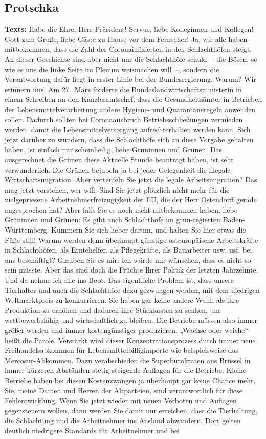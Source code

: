 \documentclass{article}
\begin{document}
\subsection{Protschka}
\noindent\textbf{Texts:} Habe die Ehre, Herr Präsident! Servus, liebe Kolleginnen und Kollegen! Gott zum Gruße, liebe Gäste zu Hause vor dem Fernseher! Ja, wir alle haben mitbekommen, dass die Zahl der Coronainfizierten in den Schlachthöfen steigt. An dieser Geschichte sind aber nicht nur die Schlachthöfe schuld – die Bösen, so wie es uns die linke Seite im Plenum weismachen will –, sondern die Verantwortung dafür liegt in erster Linie bei der Bundesregierung. Warum? Wir erinnern uns: Am 27. März forderte die Bundeslandwirtschaftsministerin in einem Schreiben an den Kanzleramtschef, dass die Gesundheitsämter in Betrieben der Lebensmittelverarbeitung andere Hygiene- und Quarantäneregeln anwenden sollen. Dadurch sollten bei Coronaausbruch Betriebsschließungen vermieden werden, damit die Lebensmittelversorgung aufrechterhalten werden kann. Sich jetzt darüber zu wundern, dass die Schlachthöfe sich an diese Vorgabe gehalten haben, ist einfach nur scheinheilig, liebe Grüninnen und Grünen.  Das ausgerechnet die Grünen diese Aktuelle Stunde beantragt haben, ist sehr verwunderlich. Die Grünen bejubeln ja bei jeder Gelegenheit die illegale Wirtschaftsmigration.  Aber verteufeln Sie jetzt die legale Arbeitsmigration? Das mag jetzt verstehen, wer will. Sind Sie jetzt plötzlich nicht mehr für die vielgepriesene Arbeitnehmerfreizügigkeit der EU, die der Herr Ostendorff gerade angesprochen hat? Aber falls Sie es noch nicht mitbekommen haben, liebe Grüninnen und Grünen: Es gibt auch Schlachthöfe im grün-regierten Baden-Württemberg. Kümmern Sie sich lieber darum, und halten Sie hier etwas die Füße still! Warum werden denn überhaupt günstige osteuropäische Arbeitskräfte in Schlachthöfen, als Erntehelfer, als Pflegekräfte, als Bauarbeiter usw. usf. bei uns beschäftigt? Glauben Sie es mir: Ich würde mir wünschen, dass es nicht so sein müsste. Aber das sind doch die Früchte Ihrer Politik der letzten Jahrzehnte. Und da nehme ich alle ins Boot. Das eigentliche Problem ist, dass unsere Tierhalter und auch die Schlachthöfe dazu gezwungen werden, mit dem niedrigen Weltmarktpreis zu konkurrieren. Sie haben gar keine andere Wahl, als ihre Produktion zu erhöhen und dadurch ihre Stückkosten zu senken, um wettbewerbsfähig und wirtschaftlich zu bleiben.  Die Betriebe müssen also immer größer werden und immer kostengünstiger produzieren. „Wachse oder weiche“ heißt die Parole. Verstärkt wird dieser Konzentrationsprozess durch immer neue Freihandelsabkommen für Lebensmittelbilligimporte wie beispielsweise das Mercosur-Abkommen. Dazu verabschieden die Superbürokraten aus Brüssel in immer kürzeren Abständen stetig steigende Auflagen für die Betriebe. Kleine Betriebe haben bei diesen Kostenzwängen ja überhaupt gar keine Chance mehr. Sie, meine Damen und Herren der Altparteien, sind verantwortlich für diese Fehlentwicklung.  Wenn Sie jetzt wieder mit neuen Verboten und Auflagen gegensteuern wollen, dann werden Sie damit nur erreichen, dass die Tierhaltung, die Schlachtung und die Arbeitnehmer ins Ausland abwandern. Dort gelten deutlich niedrigere Standards für Arbeitnehmer und bei 
\end{document}
